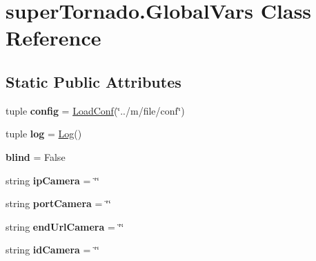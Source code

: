 \hypertarget{classsuper_tornado_1_1_global_vars}{\section{super\-Tornado.\-Global\-Vars Class Reference}
\label{classsuper_tornado_1_1_global_vars}
}
\subsection*{Static Public Attributes}
\begin{DoxyCompactItemize}
\item 
\hypertarget{classsuper_tornado_1_1_global_vars_a0091cf90c3955b9dd9917e441d6d307f}{tuple {\bfseries config} = \hyperlink{classm_1_1load_conf_1_1_load_conf}{Load\-Conf}(\char`\"{}../m/file/conf\char`\"{})}\label{classsuper_tornado_1_1_global_vars_a0091cf90c3955b9dd9917e441d6d307f}

\item 
\hypertarget{classsuper_tornado_1_1_global_vars_a027c191330c93fb0ce920d0c0cd7b8b2}{tuple {\bfseries log} = \hyperlink{classm_1_1log_1_1_log}{Log}()}\label{classsuper_tornado_1_1_global_vars_a027c191330c93fb0ce920d0c0cd7b8b2}

\item 
\hypertarget{classsuper_tornado_1_1_global_vars_a88c8b1da2e0b050af8a379a117440a44}{{\bfseries blind} = False}\label{classsuper_tornado_1_1_global_vars_a88c8b1da2e0b050af8a379a117440a44}

\item 
\hypertarget{classsuper_tornado_1_1_global_vars_a90ce11ba50f379aeb590c8e75a72a440}{string {\bfseries ip\-Camera} = \char`\"{}\char`\"{}}\label{classsuper_tornado_1_1_global_vars_a90ce11ba50f379aeb590c8e75a72a440}

\item 
\hypertarget{classsuper_tornado_1_1_global_vars_a1ac437cbfa5d3a6d35b079411ee6fb0a}{string {\bfseries port\-Camera} = \char`\"{}\char`\"{}}\label{classsuper_tornado_1_1_global_vars_a1ac437cbfa5d3a6d35b079411ee6fb0a}

\item 
\hypertarget{classsuper_tornado_1_1_global_vars_a6e47041f62f9a703fc68916c2bb9cbe5}{string {\bfseries end\-Url\-Camera} = \char`\"{}\char`\"{}}\label{classsuper_tornado_1_1_global_vars_a6e47041f62f9a703fc68916c2bb9cbe5}

\item 
\hypertarget{classsuper_tornado_1_1_global_vars_ac11b9f2e40a970b6254a02a6683d0ea9}{string {\bfseries id\-Camera} = \char`\"{}\char`\"{}}\label{classsuper_tornado_1_1_global_vars_ac11b9f2e40a970b6254a02a6683d0ea9}


\end{DoxyCompactItemize}

